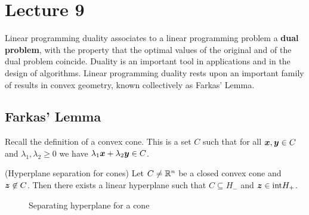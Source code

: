 %
%
% 


\chapter*{Lecture 9}
\setcounter{chapter}{9}
\setcounter{section}{0}
\setcounter{equation}{0}
\setcounter{theorem}{0}


Linear programming duality associates to a linear programming problem a \textbf{dual problem}, with the property that the optimal values of the original and of the dual problem coincide. Duality is an important tool in applications and in the design of algorithms. Linear programming duality rests upon an important family of results in convex geometry, known collectively as Farkas' Lemma.

\section{Farkas' Lemma}

Recall the definition of a convex cone. This is a set $C$ such that for all $\bm{x},\bm{y}\in C$ and $\lambda_1,\lambda_2\geq 0$ we have $\lambda_1\bm{x}+\lambda_2\bm{y}\in C$. 

\begin{lemma}(Hyperplane separation for cones)\label{le:hypcone}
 Let $C\neq \mathbb{R}^n$ be a closed convex cone and $\bm{z}\not\in C$. Then there exists a linear hyperplane such that $C\subseteq H_-$ and $\bm{z}\in {\operatorname{int}} H_+$.
\end{lemma}

\begin{figure}[h!]
\centering
{}
\caption{Separating hyperplane for a cone} \label{fig:sepcone}
\end{figure}

